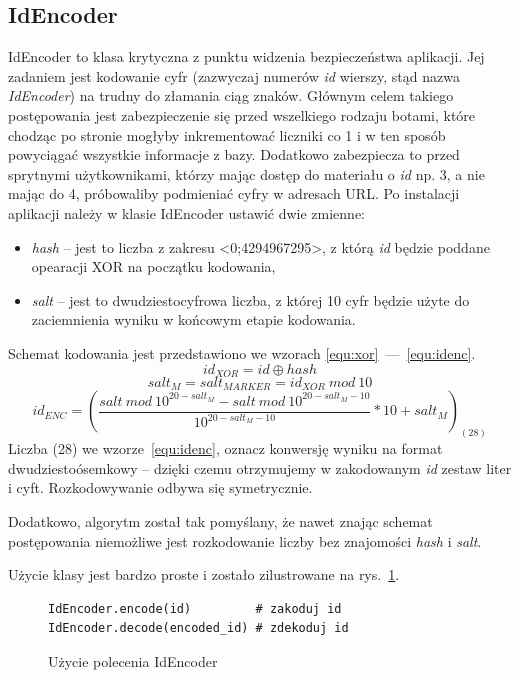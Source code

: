 \documentclass[a4paper,12pt,oneside]{report}
\begin{document}
\subsection{IdEncoder}
\label{sub:idencoder}
  IdEncoder to klasa krytyczna z punktu widzenia bezpieczeństwa aplikacji. Jej zadaniem jest kodowanie cyfr (zazwyczaj numerów \emph{id} wierszy, stąd nazwa \emph{IdEncoder}) na trudny do złamania ciąg znaków. Głównym celem takiego postępowania jest zabezpieczenie się przed wszelkiego rodzaju botami, które chodząc po stronie mogłyby inkrementować liczniki co 1 i w ten sposób powyciągać wszystkie informacje z bazy. Dodatkowo zabezpiecza to przed sprytnymi użytkownikami, którzy mając dostęp do materiału o \emph{id} np. 3, a nie mając do 4, próbowaliby podmieniać cyfry w adresach URL. Po instalacji aplikacji należy w klasie IdEncoder ustawić dwie zmienne:
\begin{itemize}
  \item \emph{hash} -- jest to liczba z zakresu <0;4294967295>, z którą \emph{id} będzie poddane opearacji XOR na początku kodowania,
  \item \emph{salt} -- jest to dwudziestocyfrowa liczba, z której 10 cyfr będzie użyte do zaciemnienia wyniku w końcowym etapie kodowania.
\end{itemize}
Schemat kodowania jest przedstawiono we wzorach \ref{equ:xor}~---~\ref{equ:idenc}.
\begin{equation}
  id_{XOR} = id \oplus hash
  \label{equ:xor}
\end{equation}
\begin{equation}
  salt_{M} = salt_{MARKER} = id_{XOR}~mod~10
  \label{equ:salt}
\end{equation}
\begin{equation}
  id_{ENC} = \left(\frac{salt~mod~10^{20 - salt_{M}} - salt~mod~10^{20 - salt_{M} - 10}}{10^{20 - salt_{M} - 10}} * 10 + salt_{M}\right)_{(28)}
  \label{equ:idenc}
\end{equation}
Liczba (28) we wzorze~\ref{equ:idenc}, oznacz konwersję wyniku na format dwudziestoósemkowy -- dzięki czemu otrzymujemy w zakodowanym \emph{id} zestaw liter i cyft. Rozkodowywanie odbywa się symetrycznie. 

Dodatkowo, algorytm został tak pomyślany, że nawet znając schemat postępowania niemożliwe jest rozkodowanie liczby bez znajomości \emph{hash} i \emph{salt}.

Użycie klasy jest bardzo proste i zostało zilustrowane na rys.~\ref{fig:idenc}.
\begin{figure}[h]
\begin{verbatim}IdEncoder.encode(id)         # zakoduj id
IdEncoder.decode(encoded_id) # zdekoduj id\end{verbatim}
\caption{Użycie polecenia IdEncoder\label{fig:idenc}}
\end{figure}
\end{document}
